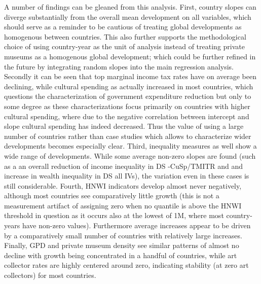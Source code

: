 \documentclass[11pt]{article}
\begin{document}
A number of findings can be gleaned from this analysis.
First, country slopes can diverge substantially from the overall mean development on all variables, which should serve as a reminder to be cautious of treating global developments as homogenous between countries. 
This also further supports the methodological choice of using country-year as the unit of analysis instead of treating private museums as a homogenous global development; which could be further refined in the future by integrating random slopes into the main regression analysis.
Secondly it can be seen that top marginal income tax rates have on average been declining, while cultural spending as actually increased in most countries, which questions the characterization of government expenditure reduction but only to some degree as these characterizations focus primarily on countries with higher cultural spending, where due to the negative correlation between intercept and slope cultural spending has indeed decreased.
Thus the value of using a large number of countries rather than case studies which allows to characterize wider developments becomes especially clear.
Third, inequality measures as well show a wide range of developments.
While some average non-zero slopes are found (such as a an overall reduction of income inequality in DS -CuSp/TMITR and and increase in wealth inequality in DS all IVs), the variation even in these cases is still considerable. 
Fourth, HNWI indicators develop almost never negatively, although most countries see comparatively little growth (this is not a measurement artifact of assigning zero when no quantile is above the HNWI threshold in question as it occurs also at the lowest of 1M, where most country-years have non-zero values).
Furthermore average increases appear to be driven by a comparatively small number of countries with relatively large increases. 
Finally, GPD and private museum density see similar patterns of almost no decline with growth being concentrated in a handful of countries, while art collector rates are highly centered around zero, indicating stability (at zero art collectors) for most countries. 
\end{document}
